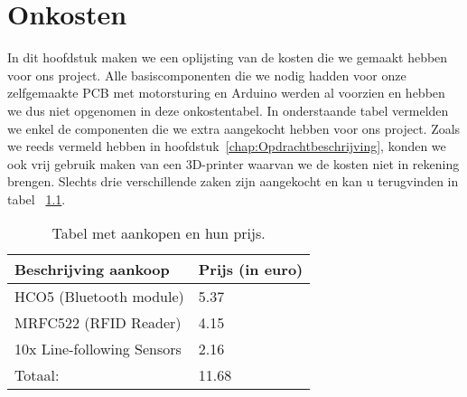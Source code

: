 \chapter{Onkosten}
In dit hoofdstuk maken we een oplijsting van de kosten die we gemaakt hebben voor ons project.  Alle basiscomponenten die we nodig hadden voor onze zelfgemaakte PCB met motorsturing en Arduino werden al voorzien en hebben we dus niet opgenomen in deze onkostentabel. In onderstaande tabel vermelden we enkel de componenten die we extra aangekocht hebben voor ons project. Zoals we reeds vermeld hebben in hoofdstuk~\ref{chap:Opdrachtbeschrijving}, konden we ook vrij gebruik maken van een 3D-printer waarvan we de kosten niet in rekening brengen. Slechts drie verschillende zaken zijn aangekocht en kan u terugvinden in tabel ~\ref{table:Onkosten}.\\
\begin {table}[H]
\caption {Tabel met aankopen en hun prijs.} \label{table:Onkosten}
\begin{center}
	\begin{tabular}{ | l | l | }
	\hline
	Beschrijving aankoop & Prijs (in euro) \\ \hline
	\hline
	HCO5 (Bluetooth module) & 5.37 \\ \hline
	MRFC522 (RFID Reader) & 4.15 \\ \hline
	10x Line-following Sensors & 2.16 \\ \hline \hline
	Totaal: & 11.68 \\ \hline
	\end{tabular}
\end{center}
\end{table}
